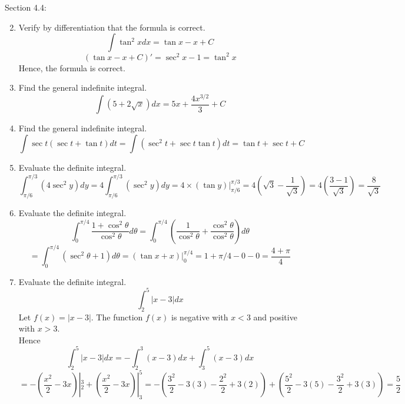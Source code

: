 \documentclass[12pt]{article}
\begin{document}
\newpage
Section 4.4:
\begin{enumerate}
\setcounter{enumi}{1}
    \item Verify by differentiation that the formula is correct.
    \[\int \tan^2 x dx = \tan x - x + C\]
    \[(\tan x - x + C)' = \sec^2 x  - 1 = \tan^2 x \]
    Hence, the formula is correct.
\setcounter{enumi}{5}
    \item Find the general indefinite integral.
    \[\int (5 + 2 \sqrt{x}) dx = 5x + \frac{4x^{3/2}}{3} + C\]
\setcounter{enumi}{17}
    \item Find the general indefinite integral.
    \[\int \sec t (\sec t + \tan t) dt = \int (\sec^2 t + \sec t \tan t) dt = \tan t + \sec t + C\]
\setcounter{enumi}{32}
    \item Evaluate the definite integral.
    \[\int_{\pi/6}^{\pi/3} (4\sec^2 y) dy = 4 \int_{\pi/6}^{\pi/3} (\sec^2 y) dy = 4 \times (\tan y)|^{\pi/3}_{\pi/6} = 4(\sqrt{3} - \frac{1}{\sqrt{3}}) = 4(\frac{3 - 1}{\sqrt{3}}) = \frac{8}{\sqrt{3}}\]
\setcounter{enumi}{38}
    \item Evaluate the definite integral.
    \[\int_{0}^{\pi/4} \frac{1 + \cos^2 \theta}{\cos^2 \theta} d\theta = \int_{0}^{\pi/4} (\frac{1}{\cos^2 \theta}  + \frac{\cos^2 \theta}{\cos^2 \theta}) d\theta\]
    \[ = \int_{0}^{\pi/4} (\sec^2 \theta  + 1)d\theta = (\tan x + x)|^{\pi/4}_{0} = 1+\pi/4 - 0 - 0 = \frac{4 + \pi}{4}\]
\setcounter{enumi}{42}
    \item Evaluate the definite integral.
    \[\int_{2}^{5} |x - 3| dx\]
    Let $f(x) = |x - 3|$. The function $f(x)$ is negative with $x < 3$ and positive with $x > 3$. \\
    Hence
    \[\int_{2}^{5} |x - 3| dx = -\int_{2}^{3} (x - 3) dx + \int_{3}^{5} (x - 3) dx\]
    \[= -(\frac{x^2}{2}-3x)|^{3}_{2} + (\frac{x^2}{2}-3x)|_{3}^{5} = -(\frac{3^2}{2} - 3(3) - \frac{2^2}{2} + 3(2)) + (\frac{5^2}{2} - 3(5) - \frac{3^2}{2} + 3(3)) = \frac{5}{2}\]
    \[\]


\end{enumerate}
\end{document}
